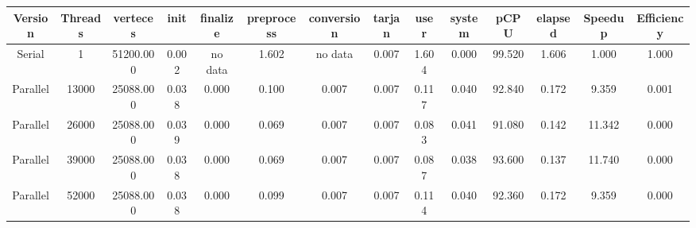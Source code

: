 \begin{tabular}{|c|c|c|c|c|c|c|c|c|c|c|c|c|c|}
\toprule
 Version &  Threads &  verteces &  init & finalize &  preprocess & conversion &  tarjan &  user &  system &   pCPU &  elapsed &  Speedup &  Efficiency \\
\midrule
  Serial &        1 & 51200.000 & 0.002 &  no data &       1.602 &    no data &   0.007 & 1.604 &   0.000 & 99.520 &    1.606 &    1.000 &       1.000 \\
Parallel &    13000 & 25088.000 & 0.038 &    0.000 &       0.100 &      0.007 &   0.007 & 0.117 &   0.040 & 92.840 &    0.172 &    9.359 &       0.001 \\
Parallel &    26000 & 25088.000 & 0.039 &    0.000 &       0.069 &      0.007 &   0.007 & 0.083 &   0.041 & 91.080 &    0.142 &   11.342 &       0.000 \\
Parallel &    39000 & 25088.000 & 0.038 &    0.000 &       0.069 &      0.007 &   0.007 & 0.087 &   0.038 & 93.600 &    0.137 &   11.740 &       0.000 \\
Parallel &    52000 & 25088.000 & 0.038 &    0.000 &       0.099 &      0.007 &   0.007 & 0.114 &   0.040 & 92.360 &    0.172 &    9.359 &       0.000 \\
\bottomrule
\end{tabular}
